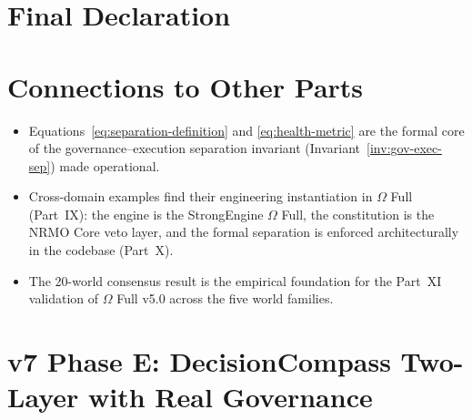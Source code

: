 \section{Final Declaration}
\label{sec:strong-engine-final}


\section*{Connections to Other Parts}

\begin{itemize}
\item Equations~\ref{eq:separation-definition} and
\ref{eq:health-metric} are the formal core of the
governance--execution separation invariant
(Invariant~\ref{inv:gov-exec-sep}) made operational.
\item Cross-domain examples find their engineering instantiation in
$\Omega$ Full (Part~IX): the engine is the StrongEngine $\Omega$
Full, the constitution is the NRMO Core veto layer, and the
formal separation is enforced architecturally in the codebase
(Part~X).
\item The 20-world consensus result is the empirical foundation for
the Part~XI validation of $\Omega$ Full v5.0 across the five
world families.
\end{itemize}

\section{v7 Phase E: DecisionCompass Two-Layer with Real Governance}
\label{sec:strong-engine-v7-phase-e}



